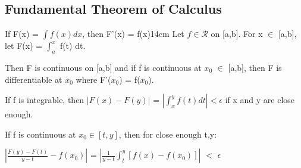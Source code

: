     \vspace{0.5cm}





\subsection{ Fundamental Theorem of Calculus }

    \begin{wtheorem}{If F(x) = $\int f(x) dx$, then F'(x) = f(x)}{14cm}
        Let $f \in \mathscr{R}$ on [a,b]. For x $\in$ [a,b], let
        F(x) = $\int_a^x$ f(t) dt.

        Then F is continuous on [a,b] and if f is continuous at $x_0$ $\in$ [a,b],
        then F is differentiable at $x_0$ where F'($x_0$) = f($x_0$).        
    \end{wtheorem}

    \begin{intuition}
        If f is integrable, then $|F(x) - F(y)|$ = $|\int_x^y f(t) dt| < \epsilon$
        if x and y are close enough.

        If f is continuous at $x_0 \in [t,y]$, then for close enough t,y:

        \hspace{0.5cm}
        $|\frac{F(y)-F(t)}{y-t} - f(x_0)|$
        = $|\frac{1}{y-t}\int_t^y [f(x) - f(x_0)]|$
        $<$ $\epsilon$
    \end{intuition}

    \vspace{0.1cm}

